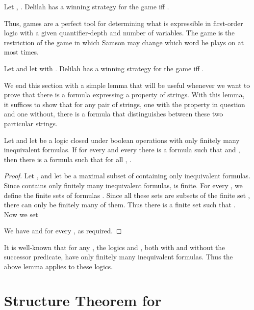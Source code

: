 \documentclass{LMCS}
\begin{document}
\begin{fact}\label{fact:ef1}
  Let , .
  Delilah has a winning strategy for the game  iff
  .
\end{fact}

Thus, \ef{} games are a perfect tool for determining what is
expressible in first-order logic with a given quantifier-depth and
number of variables.  The game  is the restriction
of the game  in which Samson may change which word he
plays on at most  times.

\begin{fact}\label{fact:ef2}
  Let  and let  with .
  Delilah has a winning strategy for the game  iff .
\end{fact}

We end this section with a simple lemma that will be useful whenever we want
to prove that there is a formula expressing a property of strings. With this
lemma, it suffices to show that for any pair of strings, one with the
property in question and one without, there is a formula that distinguishes
between these two particular strings.

\begin{lem} \label{lem:fin-equiv}
  Let  and let  be a logic closed
  under boolean operations with only finitely many inequivalent formulas. If
  for every  and every  there is a formula
   such that  and , then there is a formula  such
  that for all , .
\end{lem}

\begin{proof}
  Let , and
  let  be a maximal subset of  containing only inequivalent
  formulas. Since  contains only finitely many inequivalent formulas,
   is finite. For every , we define the finite sets of
  formulas .
  Since all these sets are subsets of the finite set , there can
  only be finitely many of them. Thus there is a finite set 
  such that . Now
  we set
  
  We have  and for every ,  as required.
\end{proof}

It is well-known \cite{I99} that for any , the logics
 and , both with and without the successor
predicate, have only finitely many inequivalent formulas. Thus the above
lemma applies to these logics.


\section{Structure Theorem for \texorpdfstring{}{FOV[<]2}} \label{sec:FO2}
\end{document}
